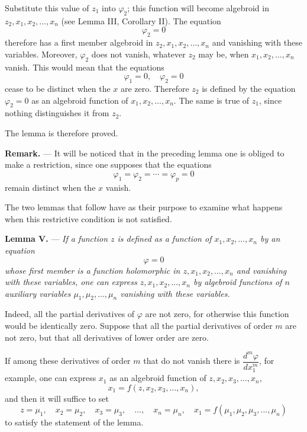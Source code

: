 \documentclass[11pt]{article}
\begin{document}
Substitute this value of $z_1$ into $\varphi_2$; this function will become algebroid in $z_2,x_1,x_2,\ldots,x_n$ (see Lemma III, Corollary II). The equation
\[
\varphi_2=0
\]
therefore has a first member algebroid in $z_2,x_1,x_2,\ldots,x_n$ and vanishing with these variables. Moreover, $\varphi_2$ does not vanish, whatever $z_2$ may be, when $x_1,x_2,\ldots,x_n$ vanish. This would mean that the equations
\[
\varphi_1=0,
\quad \varphi_2=0
\]
cease to be distinct when the $x$ are zero. Therefore $z_2$ is defined by the equation $\varphi_2=0$ as an algebroid function of $x_1,x_2,\ldots,x_n$. The same is true of $z_1$, since nothing distinguishes it from $z_2$.

The lemma is therefore proved.

\medskip
\noindent\textbf{Remark.} — It will be noticed that in the preceding lemma one is obliged to make a restriction, since one supposes that the equations
\[
\varphi_1=\varphi_2=\cdots=\varphi_p=0
\]
remain distinct when the $x$ vanish.

The two lemmas that follow have as their purpose to examine what happens when this restrictive condition is not satisfied.

\medskip
\noindent\textbf{Lemma V.} — \emph{If a function $z$ is defined as a function of $x_1,x_2,\ldots,x_n$ by an equation}
\[
\varphi=0
\]
\emph{whose first member is a function holomorphic in $z,x_1,x_2,\ldots,x_n$ and vanishing with these variables, one can express $z,x_1,x_2,\ldots,x_n$ by algebroid functions of $n$ auxiliary variables $\mu_1,\mu_2,\ldots,\mu_n$ vanishing with these variables.}

Indeed, all the partial derivatives of $\varphi$ are not zero, for otherwise this function would be identically zero. Suppose that all the partial derivatives of order $m$ are not zero, but that all derivatives of lower order are zero.

If among these derivatives of order $m$ that do not vanish there is $\dfrac{d^m\varphi}{dx_1^m}$, for example, one can express $x_1$ as an algebroid function of $z,x_2,x_3,\ldots,x_n$,
\[
x_1=f(z,x_2,x_3,\ldots,x_n),
\]
and then it will suffice to set
\[
z=\mu_1,
\quad x_2=\mu_2,
\quad x_3=\mu_3,
\quad \ldots,
\quad x_n=\mu_n,
\quad x_1=f(\mu_1,\mu_2,\mu_3,\ldots,\mu_n)
\]
to satisfy the statement of the lemma.
\end{document}
